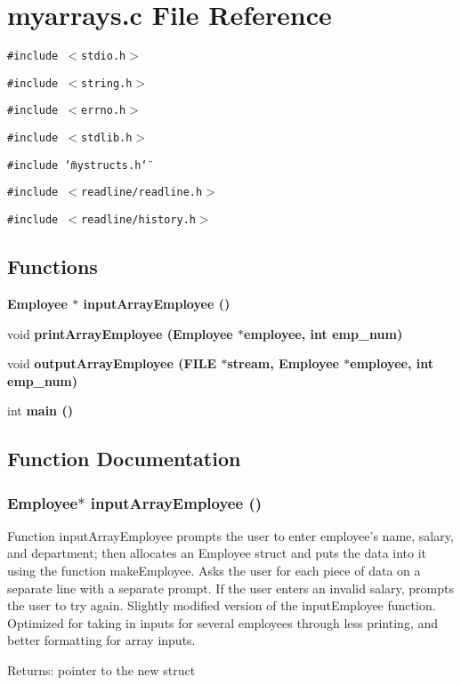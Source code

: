 \section{myarrays.c File Reference}
\label{myarrays_8c}
{\tt \#include $<$stdio.h$>$}\par
{\tt \#include $<$string.h$>$}\par
{\tt \#include $<$errno.h$>$}\par
{\tt \#include $<$stdlib.h$>$}\par
{\tt \#include \char`\"{}mystructs.h\char`\"{}}\par
{\tt \#include $<$readline/readline.h$>$}\par
{\tt \#include $<$readline/history.h$>$}\par
\subsection*{Functions}
\begin{CompactItemize}
\item 
\bf{Employee} $\ast$ \bf{input\-Array\-Employee} ()
\item 
void \bf{print\-Array\-Employee} (\bf{Employee} $\ast$employee, int emp\_\-num)
\item 
void \bf{output\-Array\-Employee} (FILE $\ast$stream, \bf{Employee} $\ast$employee, int emp\_\-num)
\item 
int \bf{main} ()
\end{CompactItemize}


\subsection{Function Documentation}
\subsubsection{\setlength{\rightskip}{0pt plus 5cm}\bf{Employee}$\ast$ input\-Array\-Employee ()}\label{myarrays_8c_8852a2b972ada6c4b9dad47135807ee9}


Function input\-Array\-Employee prompts the user to enter employee's name, salary, and department; then allocates an Employee struct and puts the data into it using the function make\-Employee. Asks the user for each piece of data on a separate line with a separate prompt. If the user enters an invalid salary, prompts the user to try again. Slightly modified version of the input\-Employee function. Optimized for taking in inputs for several employees through less printing, and better formatting for array inputs. \begin{Desc}
\item[Returns:]pointer to the new struct \end{Desc}
